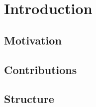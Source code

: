 \chapter{Introduction}
\label{sec:introduction}

\section{Motivation}


\section{Contributions}


\section{Structure}
